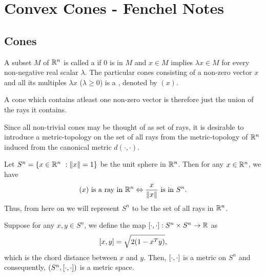 \documentclass[11pt,a4paper]{article}
\begin{document}
\newpage
\section*{Convex Cones - Fenchel Notes}

\subsection*{Cones}


\begin{definition}
    A subset $M$ of $\mathbb{R}^n$ is called a  if $0$ is in $M$ and $x\in M$ implies $\lambda x\in M$ for every non-negative real scalar $\lambda$. The particular cones consisting of a non-zero vector $x$ and all its multiples $\lambda x$ ($\lambda \ge 0$) is a , denoted by $(x)$. 
\end{definition}

\begin{remark}
    A cone which contains atleast one non-zero vector is therefore just the union of the rays it contains.
\end{remark}

Since all non-trivial cones may be thought of as set of rays, it is desirable to introduce a metric-topology on the set of all rays from the metric-topology of $\mathbb{R}^n$ induced from the canonical metric $d(\cdot,\cdot)$.

\begin{remark}
    Let $S^n = \{x\in \mathbb{R}^n\ : \|x\| = 1\}$ be the unit sphere in $\mathbb{R}^n$. Then for any $x\in \mathbb{R}^n$, we have
    \begin{equation*}
        (x) \text{ is a ray in } \mathbb{R}^n \Leftrightarrow \frac{x}{\|x\|} \text{ is in } S^n.
    \end{equation*}
    Thus, from here on we will represent $S^n$ to be the set of all rays in $\mathbb{R}^n$.
\end{remark}


\begin{proposition}
    Suppose for any $x,y\in S^n$, we define the map $[\cdot, \cdot]:S^n\times S^n\rightarrow \mathbb{R}$ as
    \begin{equation*}
        [x, y] = \sqrt{2(1 - x^Ty)},
    \end{equation*}
    which is the chord distance between $x$ and $y$. Then, $[\cdot, \cdot]$ is a metric on $S^n$ and consequently, $(S^n, [\cdot, \cdot])$ is a metric space.
\end{proposition}
\end{document}
